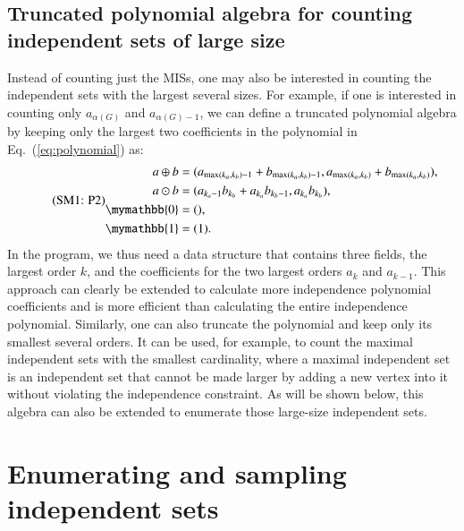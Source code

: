 \documentclass[onefignum, onetabnum]{siamart190516}
\newcommand{\eqname}[1]{\stepcounter{equation}\tag{\theequation : #1}}
\newcommand{\<}{\langle}
\renewcommand{\>}{\rangle}
\newcommand{\Eq}[1]{Eq.~(\ref{#1})}
\newcounter{example}
\begin{document}
\subsection{Truncated polynomial algebra for counting independent sets of large size}
Instead of counting just the MISs, one may also be interested in counting the independent sets with the largest several sizes.
For example, if one is interested in counting only $a_{\alpha(G)}$ and $a_{\alpha(G)-1}$, we can define a truncated polynomial algebra by keeping only the largest two coefficients in the polynomial in \Eq{eq:polynomial} as:
\begin{equation}
    \eqname{P2}
    \begin{split}
    a \oplus b &= (a_{\max(k_a, k_b)-1} + b_{\max(k_a, k_b)-1}, a_{\max(k_a, k_b)} + b_{\max(k_a, k_b)}),\\
    a \odot b &= (a_{k_a-1} b_{k_b}+a_{k_a} b_{k_b-1}, a_{k_a} b_{k_b}),\\
    \mymathbb{0} &= (), \\
    \mymathbb{1} &= (1).\label{eq:max2poly}
    \end{split}
\end{equation}
In the program, we thus need a data structure that contains three fields, the largest order $k$, and the coefficients for the two largest orders $a_k$ and $a_{k-1}$.
This approach can clearly be extended to calculate more independence polynomial coefficients and is more efficient than calculating the entire independence polynomial.
Similarly, one can also truncate the polynomial and keep only its smallest several orders.
It can be used, for example, to count the maximal independent sets with the smallest cardinality, where a maximal independent set is an independent set that cannot be made larger by adding a new vertex into it without violating the independence constraint.
As will be shown below, this algebra can also be extended to enumerate those large-size independent sets.

\section{Enumerating and sampling independent sets}\label{sec:enumeration}
\end{document}
